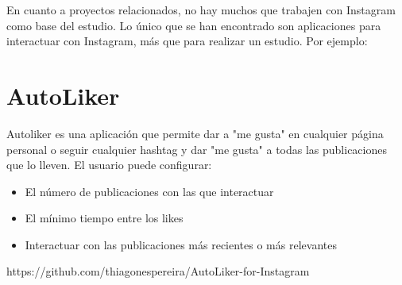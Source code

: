 
En cuanto a proyectos relacionados, no hay muchos que trabajen con Instagram como base del estudio. Lo único que se han encontrado son aplicaciones para interactuar con Instagram, más que para realizar un estudio. Por ejemplo:

\section{AutoLiker}
Autoliker es una aplicación que permite dar a "me gusta" en cualquier página personal o seguir cualquier hashtag y dar "me gusta" a todas las publicaciones que lo lleven.
El usuario puede configurar:
\begin{itemize}
	\item El número de publicaciones con las que interactuar
	\item El mínimo tiempo entre los likes
	\item Interactuar con las publicaciones más recientes o más relevantes
\end{itemize}


https://github.com/thiagonespereira/AutoLiker-for-Instagram